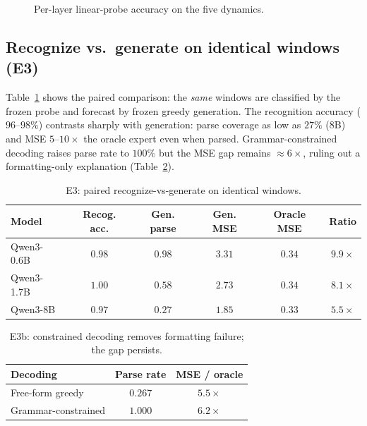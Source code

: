 \documentclass{article}
\begin{document}
\begin{figure}[t]
\centering
{}\vspace{-0.4cm}
\caption{Per-layer linear-probe accuracy on the five dynamics.}
\label{fig:layerwise}
\end{figure}

\subsection{Recognize vs.\ generate on identical windows (E3)}
Table~\ref{tab:e3} shows the paired comparison: the \emph{same} windows are
classified by the frozen probe and forecast by frozen greedy generation.  The
recognition accuracy ($96$--$98\%$) contrasts sharply with generation: parse
coverage as low as $27\%$ (8B) and MSE $5$--$10\times$ the oracle expert even
when parsed.  Grammar-constrained decoding raises parse rate to $100\%$ but
the MSE gap remains $\approx 6\times$, ruling out a formatting-only
explanation (Table~\ref{tab:e3b}).

\begin{table}[t]
\centering
\small
\begin{tabular}{lccccc}
\toprule
Model & Recog. acc. & Gen. parse & Gen. MSE & Oracle MSE & Ratio \\
\midrule
Qwen3-0.6B & $0.98$ & $0.98$ & $3.31$ & $0.34$ & $9.9\times$ \\
Qwen3-1.7B & $1.00$ & $0.58$ & $2.73$ & $0.34$ & $8.1\times$ \\
Qwen3-8B & $0.97$ & $0.27$ & $1.85$ & $0.33$ & $5.5\times$ \\
\bottomrule
\end{tabular}
\caption{E3: paired recognize-vs-generate on identical windows.}
\label{tab:e3}
\end{table}

\begin{table}[t]
\centering
\small
\begin{tabular}{lcc}
\toprule
Decoding & Parse rate & MSE / oracle \\
\midrule
Free-form greedy & $0.267$ & $5.5\times$ \\
Grammar-constrained & $1.000$ & $6.2\times$ \\
\bottomrule
\end{tabular}
\caption{E3b: constrained decoding removes formatting failure; the gap
persists.}
\label{tab:e3b}
\end{table}
\end{document}
